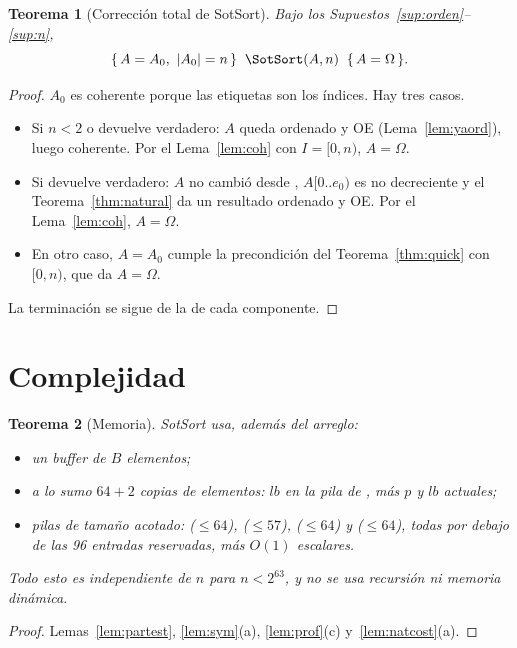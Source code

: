 \documentclass[10pt,a4paper]{article}
\theoremstyle{plain}
\newtheorem{teorema}{Teorema}[section]
\theoremstyle{definition}
\theoremstyle{remark}
\newcommand{\Bsz}{B}
\newcommand{\hoare}[3]{\{\,#1\,\}\;\;#2\;\;\{\,#3\,\}}
\begin{document}
\begin{teorema}[Corrección total de SotSort]\label{thm:main}
Bajo los Supuestos~\ref{sup:orden}--\ref{sup:n},
\[
\hoare{A=A_0,\ |A_0|=n}{\SotSort(A,n)}{A=\Omega}.
\]
\end{teorema}
\begin{proof}
$A_0$ es coherente porque las etiquetas son los índices. Hay tres casos.
\begin{itemize}[nosep]
\item Si $n<2$ o \Ordenado devuelve verdadero: $A$ queda ordenado y OE
  (Lema~\ref{lem:yaord}), luego coherente. Por el Lema~\ref{lem:coh} con $I=[0,n)$,
  $A=\Omega$.
\item Si \PocosGiros devuelve verdadero: $A$ no cambió desde \Ordenado,
  $A[0..e_0)$ es no decreciente y el Teorema~\ref{thm:natural} da un resultado
  ordenado y OE. Por el Lema~\ref{lem:coh}, $A=\Omega$.
\item En otro caso, $A=A_0$ cumple la precondición del Teorema~\ref{thm:quick} con
  $[0,n)$, que da $A=\Omega$.
\end{itemize}
La terminación se sigue de la de cada componente.
\end{proof}

\section{Complejidad}

\begin{teorema}[Memoria]\label{thm:mem}
SotSort usa, además del arreglo:
\begin{itemize}[nosep]
\item un buffer de $\Bsz$ elementos;
\item a lo sumo $64+2$ copias de elementos: $\mathit{lb}$ en la pila de \Quick, más
  $p$ y $\mathit{lb}$ actuales;
\item pilas de tamaño acotado: \Quick ($\le 64$), \Part ($\le 57$),
  \SymMerge ($\le 64$) y \Natural ($\le 64$), todas por debajo de las 96 entradas
  reservadas, más $O(1)$ escalares.
\end{itemize}
Todo esto es independiente de $n$ para $n<2^{63}$, y no se usa recursión ni memoria
dinámica.
\end{teorema}
\begin{proof}
Lemas~\ref{lem:partest}, \ref{lem:sym}(a), \ref{lem:prof}(c) y~\ref{lem:natcost}(a).
\end{proof}
\end{document}
